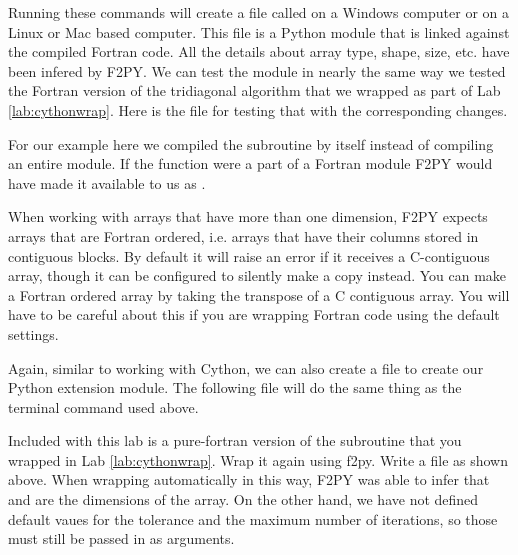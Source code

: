 Running these commands will create a file called  on a Windows computer or  on a Linux or Mac based computer.
This file is a Python module that is linked against the compiled Fortran code.
All the details about array type, shape, size, etc. have been infered by F2PY.
We can test the module in nearly the same way we tested the Fortran version of the tridiagonal algorithm that we wrapped as part of Lab \ref{lab:cythonwrap}.
Here is the file for testing that with the corresponding changes.

\begin{info}
For our example here we compiled the subroutine by itself instead of compiling an entire module.
If the function were a part of a Fortran module  F2PY would have made it available to us as .
\end{info}

\begin{warn}
When working with arrays that have more than one dimension, F2PY expects arrays that are Fortran ordered, i.e. arrays that have their columns stored in contiguous blocks.
By default it will raise an error if it receives a C-contiguous array, though it can be configured to silently make a copy instead.
You can make a Fortran ordered array by taking the transpose of a C contiguous array.
You will have to be careful about this if you are wrapping Fortran code using the default settings.
\end{warn}

Again, similar to working with Cython, we can also create a  file to create our Python extension module.
The following  file will do the same thing as the terminal command used above.


\begin{problem}
Included with this lab is a pure-fortran version of the  subroutine that you wrapped in Lab \ref{lab:cythonwrap}.
Wrap it again using f2py.
Write a  file as shown above.
When wrapping automatically in this way, F2PY was able to infer that  and  are the dimensions of the array.
On the other hand, we have not defined default vaues for the tolerance and the maximum number of iterations, so those must still be passed in as arguments.
\end{problem}

